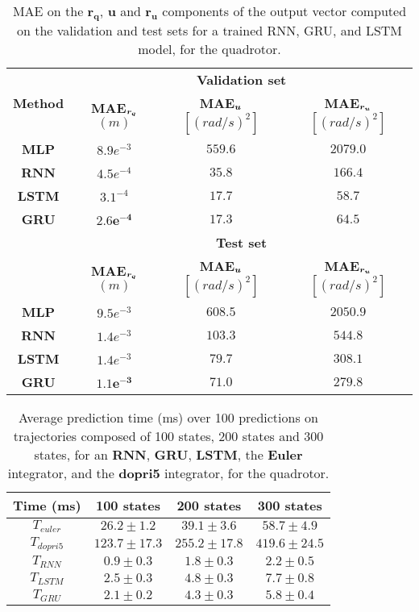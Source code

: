 \begin{table}[h!]
\centering
\begin{tabular}{ | c | c  c  c | }
\hline
    \multirow{2}{*}{\textbf{Method}} & \multicolumn{3}{c|}{\textbf{Validation set}} \\ \cline{2-4}
    & \textbf{MAE$_{\boldsymbol{r_q}}$} $(m)$  & \textbf{MAE$_{\boldsymbol{u}}$} $[(rad/s)^2]$ & \textbf{MAE$_{\boldsymbol{r_u}}$} $[(rad/s)^2]$ \\ \hline
{\textbf{MLP}} & $8.9e^{-3}$ & $559.6$ & $2079.0$ \\ 
{\textbf{RNN}} & $4.5e^{-4}$ & $35.8$ & $166.4$ \\ 
{\textbf{LSTM}} & $3.1^{-4}$ & $17.7$ & $\boldsymbol{58.7}$ \\ 
{\textbf{GRU}} & $\boldsymbol{2.6e^{-4}}$ & $\boldsymbol{17.3}$ & $64.5$ \\ 
\hline
    & \multicolumn{3}{c|}{\textbf{Test set}}\\ \cline{2-4}
    & \textbf{MAE$_{\boldsymbol{r_q}}$} $(m)$  & \textbf{MAE$_{\boldsymbol{u}}$} $[(rad/s)^2]$ & \textbf{MAE$_{\boldsymbol{r_u}}$} $[(rad/s)^2]$ \\ \hline
{\textbf{MLP}} & $9.5e^{-3}$ & $608.5$ & $2050.9$ \\ 
{\textbf{RNN}} &  $1.4e^{-3}$ & $103.3$ & $544.8$ \\ 
{\textbf{LSTM}} & $1.4e^{-3}$ & $79.7$ & $308.1$ \\ 
{\textbf{GRU}} & $\boldsymbol{1.1e^{-3}}$ & $\boldsymbol{71.0}$ & $\boldsymbol{279.8}$ \\ 
\hline
    
\end{tabular}
\caption{
MAE on the $\boldsymbol{r_q}$, $\boldsymbol{u}$ and $\boldsymbol{r_u}$ components of the output vector computed on the validation and test sets for a trained RNN, GRU, and LSTM model, for the quadrotor.}
    \label{tab:NN_results_table_Q}
\end{table}

\begin{table}[t]
\centering
\begin{tabular}{ | c | c  c  c | }
\hline
    \textbf{Time (ms)} & 100 states  & 200 states & 300 states \\ \hline
    $T_{euler}$ & $26.2 \pm 1.2$ & $39.1 \pm 3.6$ & $58.7 \pm 4.9$ \\ 
$T_{dopri5}$ & $123.7 \pm 17.3$ & $255.2 \pm 17.8$ & $419.6 \pm 24.5$ \\ 
$T_{RNN}$ & $\boldsymbol{0.9} \pm 0.3$ & $\boldsymbol{1.8} \pm 0.3$ & $\boldsymbol{2.2} \pm 0.5$ \\ 
$T_{LSTM}$ & $2.5 \pm 0.3$ & $4.8 \pm 0.3$ & $7.7 \pm 0.8$ \\ 
$T_{GRU}$ & $2.1 \pm 0.2$ & $4.3 \pm 0.3$ & $5.8 \pm 0.4$  \\ \hline
\end{tabular}
\caption{
Average prediction time (ms) over 100 predictions on trajectories composed of 100 states, 200 states and 300 states, for an \textbf{RNN}, \textbf{GRU}, \textbf{LSTM}, the \textbf{Euler} integrator, and the \textbf{dopri5} integrator, for the quadrotor.}
    \label{tab:timepred}
\end{table}
